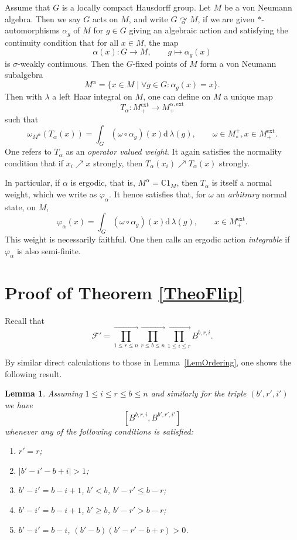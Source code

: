 \documentclass[11pt, reqno]{amsart}
\newtheorem{lemma}[theorem]{Lemma}
\theoremstyle{definition}
\numberwithin{equation}{section}
\def\beq{\begin{equation}}
\def\eeq{\end{equation}}
\def\longra{\longrightarrow}
\newcommand{\hm}[1]{\left|#1\right|}                                                    %
\newcommand{\hs}[1]{\left[#1\right]}                                                    %
\def\le{\leqslant}
\def\ge{\geqslant}
\def\C{\mathbb C}
\def\Fc{\mathcal F'}
\newcommand{\rd}{\mathrm{d}\!\,}
\newcommand{\ext}{\mathrm{ext}}
\begin{document}
Assume that $G$ is a locally compact Hausdorff group. Let $M$ be a von Neumann algebra. Then we say $G$ acts on $M$, and write $G \underset{\alpha}{\curvearrowright} M$, if we are given $*$-automorphisms $\alpha_g$ of $M$ for $g\in G$ giving an algebraic action and satisfying the continuity condition that for all $x\in M$, the map 
\[
\alpha(x)\colon  G \rightarrow M,\qquad g \mapsto \alpha_g(x)
\]
is $\sigma$-weakly continuous. Then the $G$-fixed points of $M$ form a von Neumann subalgebra
\[
M^{\alpha} = \{x\in M\mid \forall g\in G: \alpha_g(x) = x\}.
\]
Then with $\lambda$ a left Haar integral on $M$, one can define on $M$ a unique map 
\begin{equation}\label{EqOpValWeight}
T_{\alpha}\colon  M_+^{\ext} \rightarrow M_+^{\alpha,\ext}
\end{equation}
such that 
\[
\omega_{M^{\alpha}}(T_{\alpha}(x)) = \int_G (\omega\circ \alpha_g)(x)\rd \lambda(g),\qquad \omega \in M_*^+,x\in M_+^{\ext}.
\]
One refers to $T_{\alpha}$ as an  \emph{operator valued weight}. It again satisfies the normality condition that if $x_i \nearrow x$ strongly, then $T_{\alpha}(x_i) \nearrow T_{\alpha}(x)$ strongly. 

In particular, if $\alpha$ is ergodic, that is, $M^{\alpha} = \C 1_M$, then $T_{\alpha}$ is itself a normal weight, which we write as $\varphi_{\alpha}$. It hence satisfies that, for $\omega$ an \emph{arbitrary} normal state, on $M$,
\begin{equation}\label{EqIntegratedWeight}
\varphi_{\alpha}(x) = \int_G (\omega\circ \alpha_g)(x)\rd \lambda(g),\qquad x\in M_+^{\ext}.
\end{equation}
This weight is necessarily faithful. One then calls an ergodic action \emph{integrable} if $\varphi_{\alpha}$ is also semi-finite.



\section{Proof of Theorem \ref{TheoFlip}}\label{AppProofTheoFlip}

Recall that
\beq
\label{eq:F-1}
\Fc = \prod_{1 \le r \le n}^{\longra} \prod_{r \le b \le n}^{\longra} \prod_{1 \le i \le r}^{\longra} B^{b,r,i}.
\eeq

By similar direct calculations to those in Lemma~\ref{LemOrdering}, one shows the following result.

\begin{lemma}
\label{lem:bri-bri'}
Assuming $1 \le i \le r \le b \le n$ and similarly for the triple $(b',r',i')$ we have
\beq
\label{bri-bri'}
\hs{B^{b,r,i},B^{b',r',i'}}
\eeq
whenever any of the following conditions is satisfied:
\begin{enumerate}
\item $r'=r$;
\item $\hm{b'-i'-b+i}>1$;
\item $b'-i'=b-i+1$, \; $b'<b$, \; $b'-r' \le b-r$;
\item $b'-i'=b-i+1$, \; $b'\ge b$, \; $b'-r' > b-r$;
\item $b'-i'=b-i$, \; $(b'-b)(b'-r'-b+r)>0$.
\end{enumerate}
\end{lemma}
\end{document}
